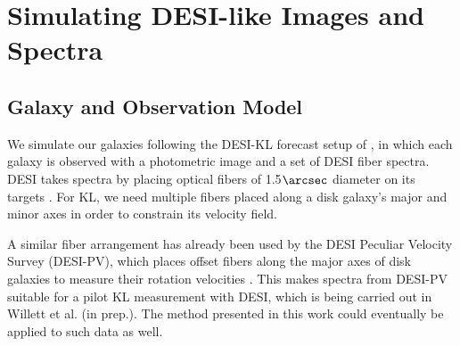 \section{Simulating DESI-like Images and Spectra}
\label{sec:data-generate}

\subsection{Galaxy and Observation Model}
\label{ssec:kl-model}

We simulate our galaxies following the DESI-KL forecast setup of \citep{KLDESI}, in which each galaxy is observed with a photometric image and a set of DESI fiber spectra. DESI takes spectra by placing optical fibers of 1.5$\arcsec$ diameter on its targets \citep{DESIOverview}. For KL, we need multiple fibers placed along a disk galaxy's major and minor axes in order to constrain its velocity field.

A similar fiber arrangement has already been used by the DESI Peculiar Velocity Survey (DESI-PV), which places offset fibers along the major axes of disk galaxies to measure their rotation velocities \citep{DESIPVTargetSel2023, DESIPVTF2025}. This makes spectra from DESI-PV suitable for a pilot KL measurement with DESI, which is being carried out in Willett et al. (in prep.). The method presented in this work could eventually be applied to such data as well.

